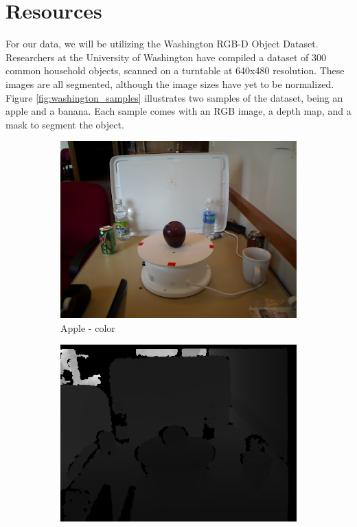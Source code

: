 \documentclass[paper=letter, fontsize=12pt]{article}
\begin{document}
\section{Resources}

For our data, we will be utilizing the Washington RGB-D
Object Dataset. Researchers at the University of Washington have compiled a
dataset of 300 common household objects, scanned on a turntable at 640x480
resolution. These images are all segmented, although the image sizes have yet to
be normalized. Figure \ref{fig:washington_samples} illustrates two samples of the dataset, being an apple and a banana. Each sample comes with an RGB image, a depth map, and a mask to segment the object.

\begin{figure}[htbp]
	\centering
	\begin{subfigure}[b]{0.32\linewidth}
		\includegraphics[width=\textwidth]{apple_1_1_100}
		\caption{Apple - color}
	\end{subfigure}
	\begin{subfigure}[b]{0.32\linewidth}
		\includegraphics[width=\textwidth]{apple_1_1_100_depth_n}

\end{subfigure}
\end{figure}
\end{document}

